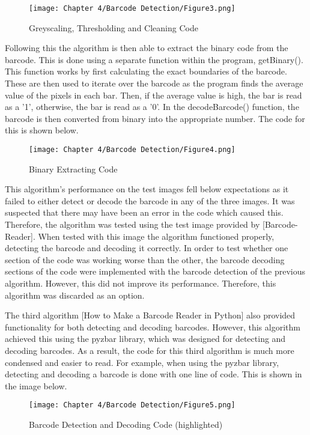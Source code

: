 \begin{figure}[H]        
    \centering
    \texttt{[image: Chapter 4/Barcode Detection/Figure3.png]}
    \caption{Greyscaling, Thresholding and Cleaning Code}
    \label{fig:bc3}
\end{figure} 

Following this the algorithm is then able to extract the binary code from the barcode.
This is done using a separate function within the program, getBinary().
This function works by first calculating the exact boundaries of the barcode.
These are then used to iterate over the barcode as the program finds the average value of the pixels in each bar.
Then, if the average value is high, the bar is read as a '1', otherwise, the bar is read as a '0'.
In the decodeBarcode() function, the barcode is then converted from binary into the appropriate number.
The code for this is shown below.

\begin{figure}[H]        
    \centering
    \texttt{[image: Chapter 4/Barcode Detection/Figure4.png]}
    \caption{Binary Extracting Code}
    \label{fig:bc4}
\end{figure} 

This algorithm's performance on the test images fell below expectations as it failed to either detect or decode the barcode in any of the three images.
It was suspected that there may have been an error in the code which caused this.
Therefore, the algorithm was tested using the test image provided by [Barcode-Reader].
When tested with this image the algorithm functioned properly, detecting the barcode and decoding it correctly.
In order to test whether one section of the code was working worse than the other, the barcode decoding sections of the code were implemented with the barcode detection of the previous algorithm.
However, this did not improve its performance.
Therefore, this algorithm was discarded as an option.

The third algorithm [How to Make a Barcode Reader in Python] also provided functionality for both detecting and decoding barcodes.
However, this algorithm achieved this using the pyzbar library, which was designed for detecting and decoding barcodes.
As a result, the code for this third algorithm is much more condensed and easier to read.
For example, when using the pyzbar library, detecting and decoding a barcode is done with one line of code.
This is shown in the image below.

\begin{figure}[H]        
    \centering
    \texttt{[image: Chapter 4/Barcode Detection/Figure5.png]}
    \caption{Barcode Detection and Decoding Code (highlighted)}
    \label{fig:bc5} 
\end{figure} 

